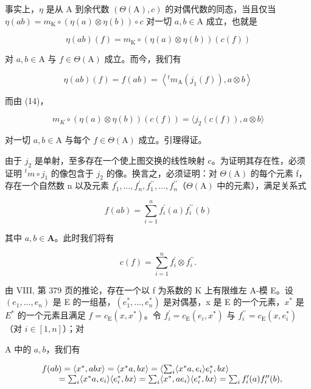 事实上，\(\eta\) 是从 A 到余代数 \((\Theta (\mathrm{A}),c)\) 的对偶代数的同态，当且仅当 \(\eta (ab) = m_{\mathrm{K}}\circ (\eta (a)\otimes \eta (b))\circ c\) 对一切 \(a,b\in \mathrm{A}\) 成立，也就是

\[
\eta (a b) (f) = m _ {\mathrm{K}} \circ (\eta (a) \otimes \eta (b)) (c (f))
\]

对 \(a, b \in \mathrm{A}\) 与 \(f \in \Theta(\mathrm{A})\) 成立。而今，我们有

\[
\eta (a b) (f) = f (a b) = \left\langle {} ^ {t} m _ {\mathrm{A}} \left(j _ {1} (f)\right), a \otimes b \right\rangle
\]

而由 (14)，

\[
m _ {K} \circ (\eta (a) \otimes \eta (b)) (c (f)) = \langle j _ {2} (c (f)), a \otimes b \rangle
\]

对一切 \(a, b \in \mathrm{A}\) 与每个 \(f \in \Theta(\mathrm{A})\) 成立。引理得证。

由于 \(j_{2}\) 是单射，至多存在一个使上图交换的线性映射 c。为证明其存在性，必须证明 \(^{t}m \circ j_{1}\) 的像包含于 \(j_{2}\) 的像。换言之，必须证明：对 \(\Theta(\mathrm{A})\) 的每个元素 f，存在一个自然数 n 以及元素 \(f_{1}^{\prime}, \ldots, f_{n}^{\prime}, f_{1}^{\prime\prime}, \ldots, f_{n}^{\prime\prime}\)（\(\Theta(\mathrm{A})\) 中的元素），满足关系式

\[
f (a b) = \sum_ {i = 1} ^ {n} f _ {i} ^ {\prime} (a) f _ {i} ^ {\prime \prime} (b)\tag{16}
\]

其中 \(a, b \in \mathbf{A}\)。此时我们将有

\[
c (f) = \sum_ {i = 1} ^ {n} f _ {i} ^ {\prime} \otimes f _ {i} ^ {\prime \prime}.\tag{17}
\]

由 VIII, 第 379 页的推论，存在一个以 f 为系数的 K 上有限维左 A-模 E。设 \((e_{1},\ldots,e_{n})\) 是 E 的一组基，\((e_{1}^{*},\ldots,e_{n}^{*})\) 是对偶基，x 是 E 的一个元素，\(x^{*}\) 是 \(E^{*}\) 的一个元素且满足 \(f=c_{\mathrm{E}}(x,x^{*})\)。令 \(f_{i}^{\prime}=c_{\mathrm{E}}(e_{i},x^{*})\) 与 \(f_{i}^{\prime\prime}=c_{\mathrm{E}}(x,e_{i}^{*})\)（对 \(i\in[1,n]\)）；对

A 中的 \(a, b\)，我们有

\[
\begin{array}{r l} & {f (a b) = \langle x ^ {*}, a b x \rangle = \langle x ^ {*} a, b x \rangle = \left\langle \sum_ {i} \langle x ^ {*} a, e _ {i} \rangle e _ {i} ^ {*}, b x \right\rangle} \\ & {\qquad = \sum_ {i} \langle x ^ {*} a, e _ {i} \rangle \langle e _ {i} ^ {*}, b x \rangle = \sum_ {i} \langle x ^ {*}, a e _ {i} \rangle \langle e _ {i} ^ {*}, b x \rangle = \sum_ {i} f _ {i} ^ {\prime} (a) f _ {i} ^ {\prime \prime} (b),} \end{array}
\]

